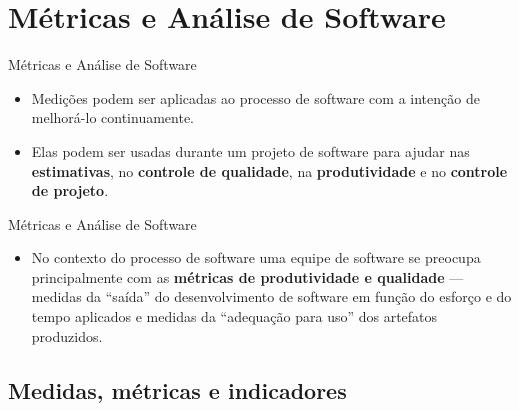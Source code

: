 \documentclass{beamer}
\begin{document}
\section{Métricas e Análise de Software}

\begin{frame}{Métricas e Análise de Software}
	\begin{itemize}
		\justifying
		\item Medições podem ser aplicadas ao processo de software com a intenção de melhorá-lo continuamente.
		\item Elas podem ser usadas durante um projeto de software para ajudar nas \textbf{estimativas}, no \textbf{controle de qualidade}, na \textbf{produtividade} e no \textbf{controle de projeto}.
	\end{itemize}
\end{frame}

\begin{frame}{Métricas e Análise de Software}
	\begin{itemize}
		\justifying
		\item No contexto do processo de software uma equipe de software se preocupa principalmente com as \textbf{métricas de produtividade e qualidade} --- medidas da ``saída'' do desenvolvimento de software em função do esforço e do tempo aplicados e medidas da ``adequação para uso'' dos artefatos produzidos.
	\end{itemize}
\end{frame}

\subsection{Medidas, métricas e indicadores}
\end{document}
